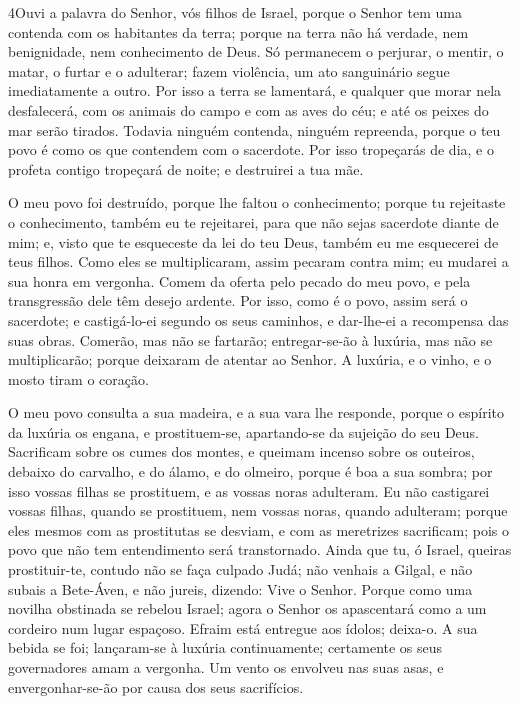 \medskip

\lettrine{4} Ouvi a palavra do Senhor, vós filhos de Israel,
porque o Senhor tem uma contenda com os habitantes da terra; porque
na terra não há verdade, nem benignidade, nem conhecimento de Deus.
Só permanecem o perjurar, o mentir, o matar, o furtar e o
adulterar; fazem violência, um ato sanguinário segue imediatamente a
outro. Por isso a terra se lamentará, e qualquer que morar nela
desfalecerá, com os animais do campo e com as aves do céu; e até os
peixes do mar serão tirados. Todavia ninguém contenda, ninguém
repreenda, porque o teu povo é como os que contendem com o
sacerdote. Por isso tropeçarás de dia, e o profeta contigo
tropeçará de noite; e destruirei a tua mãe.

O meu povo foi destruído, porque lhe faltou o conhecimento; porque
tu rejeitaste o conhecimento, também eu te rejeitarei, para que não
sejas sacerdote diante de mim; e, visto que te esqueceste da lei do
teu Deus, também eu me esquecerei de teus filhos. Como eles se
multiplicaram, assim pecaram contra mim; eu mudarei a sua honra em
vergonha. Comem da oferta pelo pecado do meu povo, e pela
transgressão dele têm desejo ardente. Por isso, como é o povo,
assim será o sacerdote; e castigá-lo-ei segundo os seus caminhos, e
dar-lhe-ei a recompensa das suas obras. Comerão, mas não se
fartarão; entregar-se-ão à luxúria, mas não se multiplicarão; porque
deixaram de atentar ao Senhor. A luxúria, e o vinho, e o
mosto tiram o coração.

O meu povo consulta a sua madeira, e a sua vara lhe responde,
porque o espírito da luxúria os engana, e prostituem-se,
apartando-se da sujeição do seu Deus. Sacrificam sobre os
cumes dos montes, e queimam incenso sobre os outeiros, debaixo do
carvalho, e do álamo, e do olmeiro, porque é boa a sua sombra; por
isso vossas filhas se prostituem, e as vossas noras adulteram.
Eu não castigarei vossas filhas, quando se prostituem, nem
vossas noras, quando adulteram; porque eles mesmos com as
prostitutas se desviam, e com as meretrizes sacrificam; pois o povo
que não tem entendimento será transtornado. Ainda que tu, ó
Israel, queiras prostituir-te, contudo não se faça culpado Judá; não
venhais a Gilgal, e não subais a Bete-Áven, e não jureis, dizendo:
Vive o Senhor. Porque como uma novilha obstinada se rebelou
Israel; agora o Senhor os apascentará como a um cordeiro num lugar
espaçoso. Efraim está entregue aos ídolos; deixa-o. A
sua bebida se foi; lançaram-se à luxúria continuamente; certamente
os seus governadores amam a vergonha. Um vento os envolveu
nas suas asas, e envergonhar-se-ão por causa dos seus sacrifícios.

